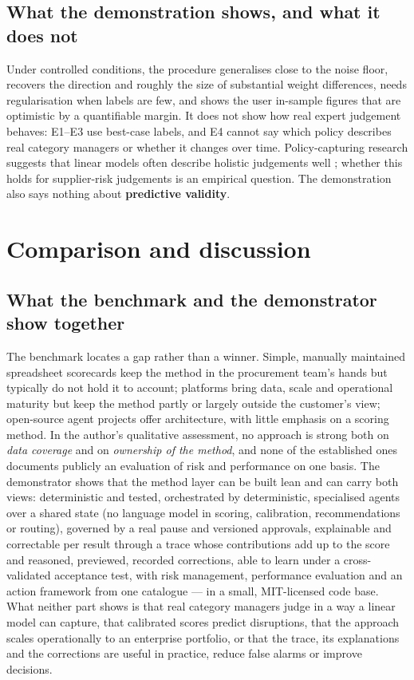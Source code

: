 \documentclass[10pt,twocolumn,a4paper]{article}
\begin{document}
\subsection{What the demonstration shows, and what it does not}
Under controlled conditions, the procedure generalises close to the noise floor,
recovers the direction and roughly the size of substantial weight differences, needs
regularisation when labels are few, and shows the user in-sample figures that are
optimistic by a quantifiable margin. It does not show how real expert judgement behaves:
E1--E3 use best-case labels, and E4 cannot say which policy describes real category
managers or whether it changes over time. Policy-capturing research suggests that linear
models often describe holistic judgements well \cite{karelaia2008}; whether this holds for
supplier-risk judgements is an empirical question. The demonstration also says nothing
about \textbf{predictive validity}.

\section{Comparison and discussion}
\label{sec:discussion}

\subsection{What the benchmark and the demonstrator show together}
The benchmark locates a gap rather than a winner. Simple, manually maintained spreadsheet
scorecards keep the method in the procurement team's hands but typically do not hold it to
account; platforms bring data, scale and
operational maturity but keep the method partly or largely outside the customer's view;
open-source agent projects offer architecture, with little emphasis on a scoring method.
In the author's qualitative assessment, no approach is strong both on \emph{data coverage}
and on \emph{ownership of the method}, and none of the established ones documents
publicly an evaluation of risk and performance on one basis. The demonstrator shows that
the method layer can be built lean and can carry both views: deterministic and tested,
orchestrated by deterministic, specialised agents over a shared state (no language
model in scoring, calibration, recommendations or routing), governed by a real pause and
versioned approvals, explainable and correctable per result through a trace whose
contributions add up to the score and reasoned, previewed, recorded corrections, able to learn
under a cross-validated acceptance test, with risk
management, performance evaluation and an action framework from one catalogue --- in a
small, MIT-licensed code base. What
neither part shows is that real category managers judge in a way a linear model can
capture, that calibrated scores predict disruptions, that the approach scales
operationally to an enterprise portfolio, or that the trace, its explanations and the
corrections are useful in practice, reduce false alarms or improve decisions.
\end{document}
